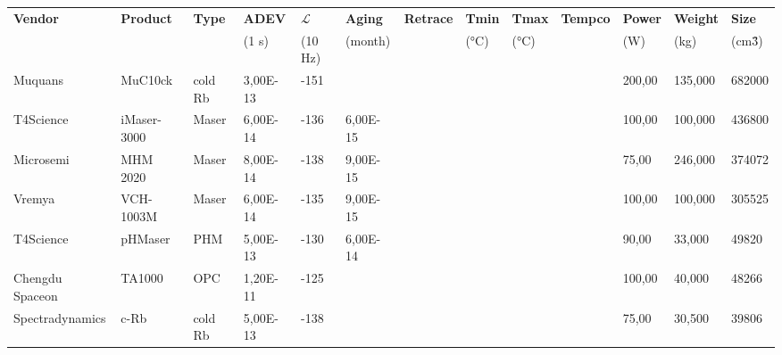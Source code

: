 ﻿\begin{table}
    \centering
    \begin{tabular}{ll|lllllllllll}
        \hline
        \textbf{Vendor} & \textbf{Product} & \textbf{Type} & \textbf{ADEV} & \textbf{$\mathcal{L}$} & \textbf{Aging} & \textbf{Retrace} & \textbf{Tmin} & \textbf{Tmax} & \textbf{Tempco} & \textbf{Power} & \textbf{Weight} & \textbf{Size} \\
        ~               & ~                & ~             & (1 s)         & (10 Hz)                & (month)        & ~                & (°C)          & (°C)          & ~               & (W)            & (kg)            & (cm\^3)       \\
        \hline
        Muquans         & MuC10ck          & cold Rb       & 3,00E-13      & -151                   & ~              & ~                & ~             & ~             & ~               & 200,00         & 135,000         & 682000        \\
        T4Science       & iMaser-3000      & Maser         & 6,00E-14      & -136                   & 6,00E-15       & ~                & ~             & ~             & ~               & 100,00         & 100,000         & 436800        \\
        Microsemi       & MHM 2020         & Maser         & 8,00E-14      & -138                   & 9,00E-15       & ~                & ~             & ~             & ~               & 75,00          & 246,000         & 374072        \\
        Vremya          & VCH-1003M        & Maser         & 6,00E-14      & -135                   & 9,00E-15       & ~                & ~             & ~             & ~               & 100,00         & 100,000         & 305525        \\
        T4Science       & pHMaser          & PHM           & 5,00E-13      & -130                   & 6,00E-14       & ~                & ~             & ~             & ~               & 90,00          & 33,000          & 49820         \\
        Chengdu Spaceon & TA1000           & OPC           & 1,20E-11      & -125                   & ~              & ~                & ~             & ~             & ~               & 100,00         & 40,000          & 48266         \\
        Spectradynamics & c-Rb             & cold Rb       & 5,00E-13      & -138                   & ~              & ~                & ~             & ~             & ~               & 75,00          & 30,500          & 39806         \\

\end{tabular}
\end{table}

